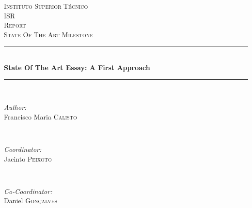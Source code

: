 \begin{titlepage}

\newcommand{\HRule}{\rule{\linewidth}{0.5mm}} %

\center %
 

\textsc{\LARGE Instituto Superior T\'{e}cnico}\\[1.5cm]
\textsc{\Large ISR}\\[0.5cm]
\textsc{\large Report}\\[0.25cm]
\textsc{\small State Of The Art Milestone}\\[0.25cm]


\HRule \\[0.5cm]
{ \large \bfseries State Of The Art Essay: A First Approach}\\[0.25cm] %
\HRule \\[0.5cm]
 

\begin{minipage}{0.4\textwidth}
\begin{flushleft} \large
\emph{Author:}\\
Francisco Maria \textsc{Calisto} %
\end{flushleft}
\end{minipage}
~
\begin{minipage}{0.4\textwidth}
\begin{flushright} \large
\emph{Coordinator:} \\
Jacinto \textsc{Peixoto} %
\end{flushright}
~
\begin{flushright} \large
\emph{Co-Coordinator:} \\
Daniel \textsc{Gon\c{c}alves} %
\end{flushright}
\end{minipage}\\[2cm]


\end{titlepage}
